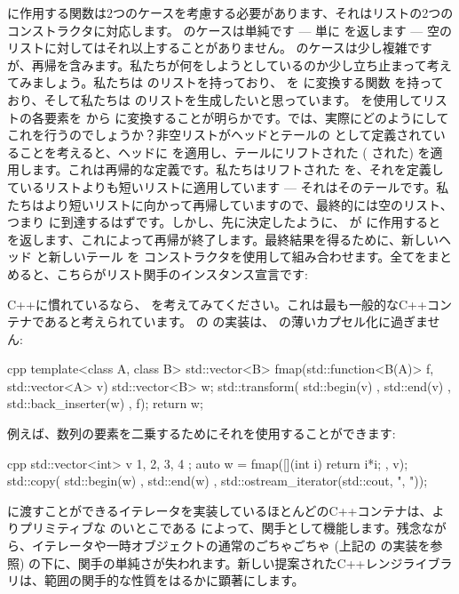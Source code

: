  に作用する関数は2つのケースを考慮する必要があります、それはリストの2つのコンストラクタに対応します。 のケースは単純です --- 単に  を返します --- 空のリストに対してはそれ以上することがありません。 のケースは少し複雑ですが、再帰を含みます。私たちが何をしようとしているのか少し立ち止まって考えてみましょう。私たちは  のリストを持っており、 を  に変換する関数  を持っており、そして私たちは  のリストを生成したいと思っています。 を使用してリストの各要素を  から  に変換することが明らかです。では、実際にどのようにしてこれを行うのでしょうか？非空リストがヘッドとテールの  として定義されていることを考えると、ヘッドに  を適用し、テールにリフトされた ( された)  を適用します。これは再帰的な定義です。私たちはリフトされた  を、それを定義しているリストよりも短いリストに適用しています --- それはそのテールです。私たちはより短いリストに向かって再帰していますので、最終的には空のリスト、つまり  に到達するはずです。しかし、先に決定したように、 が  に作用すると  を返します、これによって再帰が終了します。最終結果を得るために、新しいヘッド  と新しいテール  を  コンストラクタを使用して組み合わせます。全てをまとめると、こちらがリスト関手のインスタンス宣言です: 

C++に慣れているなら、 を考えてみてください。これは最も一般的なC++コンテナであると考えられています。  の  の実装は、 の薄いカプセル化に過ぎません: 

\begin{snip}{cpp}
template<class A, class B>
std::vector<B> fmap(std::function<B(A)> f, std::vector<A> v) {
    std::vector<B> w;
    std::transform( std::begin(v)
                  , std::end(v)
                  , std::back_inserter(w)
                  , f);
    return w;
}
\end{snip}
例えば、数列の要素を二乗するためにそれを使用することができます: 

\begin{snip}{cpp}
std::vector<int> v{ 1, 2, 3, 4 };
auto w = fmap([](int i) { return i*i; }, v);
std::copy( std::begin(w)
         , std::end(w)
         , std::ostream_iterator(std::cout, ", "));
\end{snip}
 に渡すことができるイテレータを実装しているほとんどのC++コンテナは、よりプリミティブな  のいとこである  によって、関手として機能します。残念ながら、イテレータや一時オブジェクトの通常のごちゃごちゃ (上記の  の実装を参照) の下に、関手の単純さが失われます。新しい提案されたC++レンジライブラリは、範囲の関手的な性質をはるかに顕著にします。

